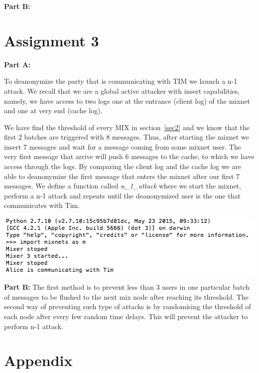 \documentclass[preprint,12pt,3p]{elsarticle}
\begin{document}
\textbf{Part B:}

\section*{Assignment 3}
\textbf{Part A:}

To deanonymize the party that is communicating with TIM we launch a n-1 attack. We recall that we are a global active attacker with insert capabilities, namely, we have access to two logs one at the entrance (client log) of the mixnet and one at very end (cache log).

We have find the threshold of every MIX in section~\ref{sec2} and we know that the first 2 batches are triggered with 8 messages. Thus, after starting the mixnet we insert 7 messages and wait for a message coming from some mixnet user. The very first message that arrive will push 6 messages to the cache, to which we have access through the logs. By comparing the client log and the cache log we are able to deanonymize the first message that enters the mixnet after our first 7 messages. We define a function called \textit{n\_1\_attack} where we start the mixnet, perform a n-1 attack and repeats until the deanonymized user is the one that communicates with Tim. \newline

\includegraphics[width=\textwidth]{alice}

\textbf{Part B:}
The first method is to prevent less than 3 users in one particular batch of messages to be flushed to the next mix node after reaching its threshold.
The second way of preventing such type of attacks is by randomising the threshold of each node after every few random time delays. This will prevent the attacker to perform n-1 attack.





\appendix
\section{Appendix}



\end{document}
